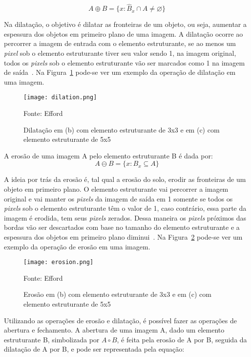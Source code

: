 \begin{displaymath}
A \oplus B = \{x : {\hat{B}}_x \cap A \neq \varnothing \}
\end{displaymath}

Na dilatação, o objetivo é dilatar as fronteiras de um objeto, ou seja, aumentar
a espessura dos objetos em primeiro plano de uma imagem. A dilatação ocorre ao
percorrer a imagem de entrada com o elemento estruturante, se ao menos um
\emph{pixel} sob o elemento estruturante tiver seu valor sendo 1, na imagem
original, todos os \emph{pixels} sob o elemento estruturante vão ser marcados
como 1 na imagem de saída~\cite{opencv2014morph}. Na
Figura~\ref{fig:dilation_ex} pode-se ver um exemplo da operação de dilatação em
uma imagem.

\begin{figure}[H]
	\centering
	\texttt{[image: dilation.png]}
	\caption{Dilatação em (b) com elemento estruturante de 3x3 e em (c) com elemento estruturante de 5x5}
Fonte: Efford~\cite{efford2000digital}
	\label{fig:dilation_ex}
\end{figure}

A erosão de uma imagem A pelo elemento estruturante B é dada por:
\begin{displaymath}
A \ominus B = \{ x : B_x \subseteq A \}
\end{displaymath}

A ideia por trás da erosão é, tal qual a erosão do solo, erodir as fronteiras de
um objeto em primeiro plano. O elemento estruturante vai percorrer a imagem
original e vai manter os \emph{pixels} da imagem de saída em 1 somente se todos
os \emph{pixels} sob o elemento estruturante têm o valor de 1, caso contrário,
essa parte da imagem é erodida, tem seus \emph{pixels} zerados. Dessa maneira os
\emph{pixels} próximos das bordas vão ser descartados com base no tamanho do
elemento estruturante e a espessura dos objetos em primeiro plano
diminui~\cite{opencv2014morph}. Na Figura~\ref{fig:erosion_ex} pode-se ver um
exemplo da operação de erosão em uma imagem.

\begin{figure}[H]
	\centering
	\texttt{[image: erosion.png]}
	\caption{Erosão em (b) com elemento estruturante de 3x3 e em (c) com elemento estruturante de 5x5}
Fonte: Efford~\cite{efford2000digital}
	\label{fig:erosion_ex}
\end{figure}

Utilizando as operações de erosão e dilatação, é possível fazer as operações de
abertura e fechamento. A abertura de uma imagem A, dado um elemento estruturante
B, simbolizada por $A \circ B$, é feita pela erosão de A por B, seguida da
dilatação de A por B, e pode ser representada pela equação:

